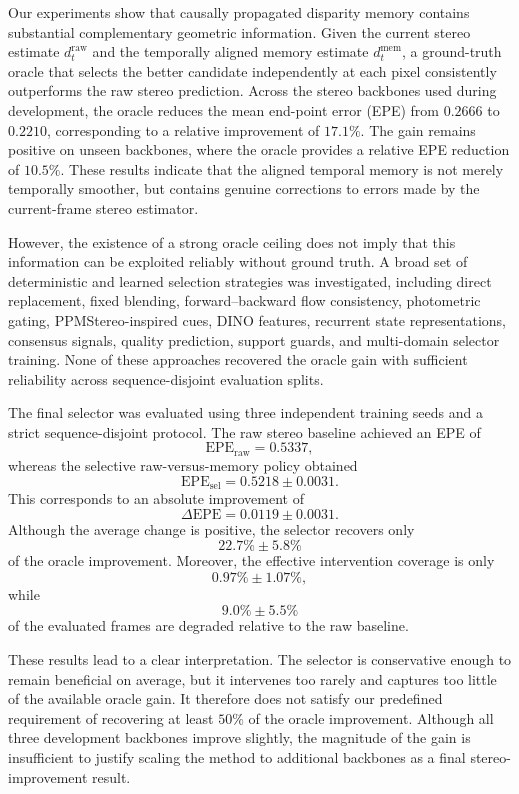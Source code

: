 \documentclass[11pt,a4paper]{article}
\begin{document}
Our experiments show that causally propagated disparity memory contains substantial complementary geometric information. Given the current stereo estimate \(d_t^{\mathrm{raw}}\) and the temporally aligned memory estimate \(d_t^{\mathrm{mem}}\), a ground-truth oracle that selects the better candidate independently at each pixel consistently outperforms the raw stereo prediction. Across the stereo backbones used during development, the oracle reduces the mean end-point error (EPE) from \(0.2666\) to \(0.2210\), corresponding to a relative improvement of \(17.1\%\). The gain remains positive on unseen backbones, where the oracle provides a relative EPE reduction of \(10.5\%\). These results indicate that the aligned temporal memory is not merely temporally smoother, but contains genuine corrections to errors made by the current-frame stereo estimator.

However, the existence of a strong oracle ceiling does not imply that this information can be exploited reliably without ground truth. A broad set of deterministic and learned selection strategies was investigated, including direct replacement, fixed blending, forward--backward flow consistency, photometric gating, PPMStereo-inspired cues, DINO features, recurrent state representations, consensus signals, quality prediction, support guards, and multi-domain selector training. None of these approaches recovered the oracle gain with sufficient reliability across sequence-disjoint evaluation splits.

The final selector was evaluated using three independent training seeds and a strict sequence-disjoint protocol. The raw stereo baseline achieved an EPE of
\[
\mathrm{EPE}_{\mathrm{raw}} = 0.5337,
\]
whereas the selective raw-versus-memory policy obtained
\[
\mathrm{EPE}_{\mathrm{sel}} = 0.5218 \pm 0.0031.
\]
This corresponds to an absolute improvement of
\[
\Delta \mathrm{EPE} = 0.0119 \pm 0.0031.
\]
Although the average change is positive, the selector recovers only
\[
22.7\% \pm 5.8\%
\]
of the oracle improvement. Moreover, the effective intervention coverage is only
\[
0.97\% \pm 1.07\%,
\]
while
\[
9.0\% \pm 5.5\%
\]
of the evaluated frames are degraded relative to the raw baseline.

These results lead to a clear interpretation. The selector is conservative enough to remain beneficial on average, but it intervenes too rarely and captures too little of the available oracle gain. It therefore does not satisfy our predefined requirement of recovering at least \(50\%\) of the oracle improvement. Although all three development backbones improve slightly, the magnitude of the gain is insufficient to justify scaling the method to additional backbones as a final stereo-improvement result.
\end{document}
